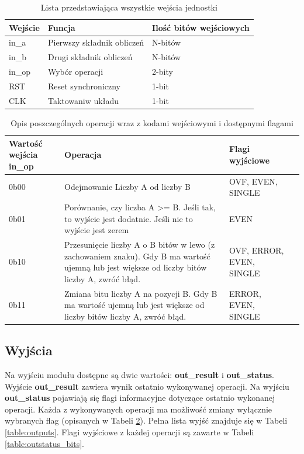 \documentclass[12pt]{article}
\begin{document}
		\begin{table}[!ht]
		\centering
		\begin{tabular}{|l|l|l|}
			\hline
			\textbf{Wejście} & \textbf{Funcja} & \textbf{Ilość bitów wejściowych} \\ \hline
			in\_a & Pierwszy składnik obliczeń & N-bitów \\ \hline
			in\_b & Drugi składnik obliczeń & N-bitów \\ \hline
			in\_op & Wybór operacji & 2-bity \\ \hline
			RST & Reset synchroniczny & 1-bit \\ \hline
			CLK & Taktowaniw układu & 1-bit \\ \hline
		\end{tabular}
		\caption{Lista przedstawiająca wszystkie wejścia jednostki}
		\label{table:inputs}
	\end{table}
	
	\begin{table}[!ht]
		\centering
		\begin{tabularx}{\linewidth}{|X|X|X|X|}
			\hline
			\textbf{Wartość wejścia in\_op} & \textbf{Operacja} & \textbf{Flagi wyjściowe} \\ \hline
			0b00 & Odejmowanie Liczby A od liczby B & OVF, EVEN, SINGLE \\ \hline
			0b01 & Porównanie, czy liczba \newline A >= B. Jeśli tak, to wyjście jest dodatnie. Jeśli nie to wyjście jest zerem & EVEN \\ \hline
			0b10 & Przesunięcie liczby A o B bitów w lewo (z zachowaniem znaku). Gdy B ma wartość ujemną lub jest większe od liczby bitów liczby A, zwróć błąd. & OVF, ERROR, EVEN, SINGLE \\ \hline
			0b11 & Zmiana bitu liczby A na pozycji B. Gdy B ma wartość ujemną lub jest większe od liczby bitów liczby A, zwróć błąd. & ERROR, EVEN, SINGLE \\ \hline
		\end{tabularx}
		\caption{Opis poszczególnych operacji wraz z kodami wejściowymi i dostępnymi flagami}
		\label{table:inop_values}
	\end{table}

	
	\subsection*{Wyjścia}
	Na wyjściu modułu dostępne są dwie wartości: \textbf{out\_result} i \textbf{out\_status}. Wyjście \textbf{out\_result} zawiera wynik ostatnio wykonywanej operacji. Na wyjściu \textbf{out\_status} pojawiają się flagi informacyjne dotyczące ostatnio wykonanej operacji. Każda z wykonywanych operacji ma możliwość zmiany wyłącznie wybranych flag (opisanych w Tabeli \ref{table:inop_values}). Pełna lista wyjść znajduje się w Tabeli \ref{table:outputs}. Flagi wyjściowe z każdej operacji są zawarte w Tabeli \ref{table:outstatus_bits}. 
	
\end{document}
